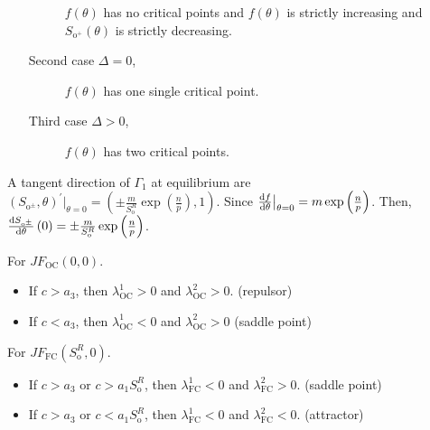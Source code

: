 \documentclass[
    8pt,
    aspectratio=1610,
    c,
    intlimits,
    leqno,
    professionalfonts,
]{beamer}
\begin{document}
\begin{frame}
\begin{enumerate}[i.]
\begin{description}
			            $f\left(\theta\right)$ has no critical points and
			            $f\left(\theta\right)$ is strictly increasing and
			            $S_{\text{o}^{+}}\left(\theta\right)$ is strictly
			            decreasing.

			      \item[Second case $\Delta=0$,]
			            $f\left(\theta\right)$ has one single critical
			            point.

			      \item[Third case $\Delta>0$,]

			            $f\left(\theta\right)$ has two critical points.
		      \end{description}
	\end{enumerate}
\end{frame}

\begin{frame}
	A tangent direction of $\Gamma_{1}$ at equilibrium are
	\begin{math}
		\left(S_{\text{o}^{\pm}},\theta\right)^{\prime}\big|_{\theta=0}=
		\left(\pm\frac{m}{S^{R}_{\text{o}}}\exp\left(\frac{n}{p}\right),1\right)
	\end{math}.
	Since $\diff{f}{\theta}\big|_{\theta=0}=m\exp\left(\frac{n}{p}\right)$.
	Then, $\diff{S_{\text{o}^{\pm}}}{\theta}\left(0\right)=\pm\frac{m}{S^{R}_{\text{o}}}\exp\left(\frac{n}{p}\right)$.

	\begin{lemma}\normalfont
		For $JF_{\text{OC}}\left(0,0\right)$.
		\begin{itemize}
			\item

			      If $c>a_{3}$, then $\lambda^{1}_{\text{OC}}>0$ and $\lambda^{2}_{\text{OC}}>0$. (repulsor)

			\item
			      If $c<a_{3}$, then $\lambda^{1}_{\text{OC}}<0$ and $\lambda^{2}_{\text{OC}}>0$ (saddle point)
		\end{itemize}

		For $JF_{\text{FC}}\left(S^{R}_{\text{o}},0\right)$.
		\begin{itemize}
			\item

			      If $c>a_{3}$ or $c>a_{1}S^{R}_{\text{o}}$, then $\lambda^{1}_{\text{FC}}<0$ and $\lambda^{2}_{\text{FC}}>0$. (saddle point)

			\item

			      If $c>a_{3}$ or $c<a_{1}S^{R}_{\text{o}}$, then $\lambda^{1}_{\text{FC}}<0$ and $\lambda^{2}_{\text{FC}}<0$. (attractor)
		\end{itemize}
	\end{lemma}
\end{frame}
\end{document}
